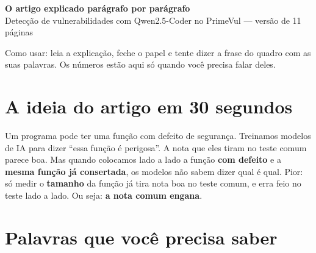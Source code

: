 \documentclass[11pt,a4paper]{article}
\begin{document}
{\LARGE\bfseries\color{azul} O artigo explicado parágrafo por parágrafo}\\[3pt]
Detecção de vulnerabilidades com Qwen2.5-Coder no PrimeVul --- versão de 11 páginas

\vspace{6pt}
Como usar: leia a explicação, feche o papel e tente dizer a frase do quadro com as suas palavras. Os números estão aqui só quando você precisa falar deles.

\section{A ideia do artigo em 30 segundos}

Um programa pode ter uma função com defeito de segurança. Treinamos modelos de IA para dizer ``essa função é perigosa''. A nota que eles tiram no teste comum parece boa. Mas quando colocamos lado a lado a função \textbf{com defeito} e a \textbf{mesma função já consertada}, os modelos não sabem dizer qual é qual. Pior: só medir o \textbf{tamanho} da função já tira nota boa no teste comum, e erra feio no teste lado a lado. Ou seja: \textbf{a nota comum engana}.

\section{Palavras que você precisa saber}
\end{document}

